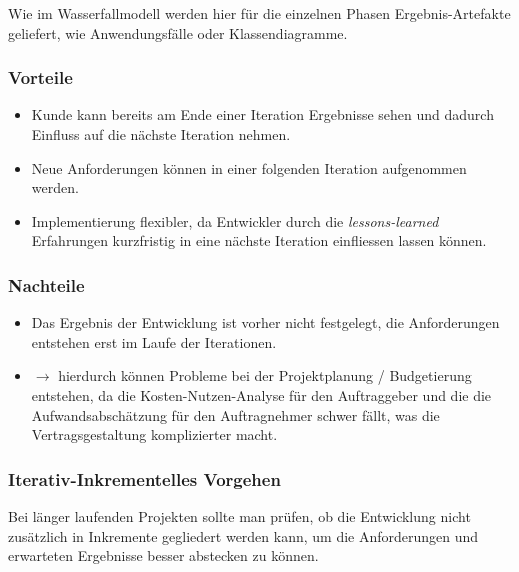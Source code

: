 \noindent
Wie im Wasserfallmodell werden hier für die einzelnen Phasen Ergebnis-Artefakte geliefert, wie Anwendungsfälle oder Klassendiagramme.


\subsubsection*{Vorteile}

\begin{itemize}
    \item Kunde kann bereits am Ende einer Iteration Ergebnisse sehen und dadurch Einfluss auf die nächste Iteration nehmen.
    \item Neue Anforderungen können in einer folgenden Iteration aufgenommen werden.
    \item Implementierung flexibler, da Entwickler durch die \textit{lessons-learned} Erfahrungen kurzfristig in eine nächste Iteration einfliessen lassen können.
\end{itemize}

\subsubsection*{Nachteile}

\begin{itemize}
    \item Das Ergebnis der Entwicklung ist vorher nicht festgelegt, die Anforderungen entstehen erst im Laufe der Iterationen.
    \item[] $\rightarrow$ hierdurch können Probleme bei der Projektplanung / Budgetierung entstehen, da die Kosten-Nutzen-Analyse für den Auftraggeber und die die Aufwandsabschätzung für den Auftragnehmer schwer fällt, was die Vertragsgestaltung komplizierter macht.
\end{itemize}

\subsubsection*{Iterativ-Inkrementelles Vorgehen}
Bei länger laufenden Projekten sollte man prüfen, ob die Entwicklung nicht zusätzlich in Inkremente gegliedert werden kann, um die Anforderungen und erwarteten Ergebnisse besser abstecken zu können.

